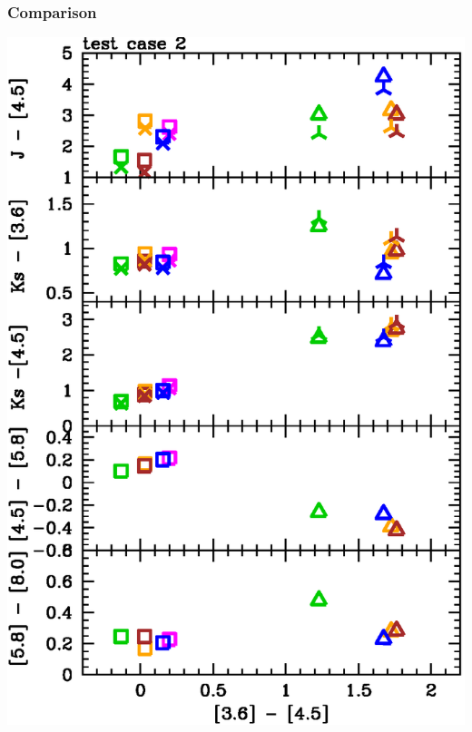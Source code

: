 \documentclass[14pt]{beamer}
\begin{document}
\begin{frame}
  \frametitle{Comparison}
  \includegraphics[width=\columnwidth]{Colours}
\end{frame}


\end{document}
